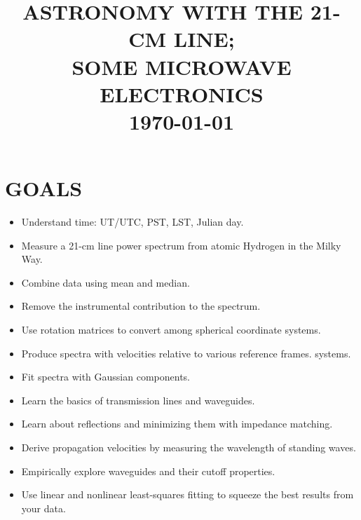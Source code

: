 \documentclass[12pt,preprint]{aastex}
\begin{document}
\def\simlt{\lower.5ex\hbox{$\; \buildrel < \over \sim \;$}}
\def\simgt{\lower.5ex\hbox{$\; \buildrel > \over \sim \;$}}

\title {ASTRONOMY WITH THE 21-CM LINE; \\ SOME MICROWAVE ELECTRONICS \\ \today}

\tableofcontents

\section{GOALS} \begin{itemize}

\item Understand time: UT/UTC, PST, LST, Julian day. 

\item Measure a 21-cm line power spectrum from atomic Hydrogen in the
  Milky Way.

\item Combine data using mean and median.

\item Remove the instrumental contribution to the spectrum.

\item Use rotation matrices to convert among spherical
  coordinate systems.

\item Produce spectra with velocities relative to various reference frames.
  systems.

\item Fit spectra with Gaussian components.

\item Learn the basics of transmission lines and waveguides.

\item Learn about reflections and minimizing them with impedance
  matching.

\item Derive propagation velocities by measuring the wavelength of
  standing waves.

\item Empirically explore waveguides and their cutoff properties.

\item Use linear and nonlinear least-squares fitting to squeeze the best
  results from your data.

\end{itemize}
\end{document}
